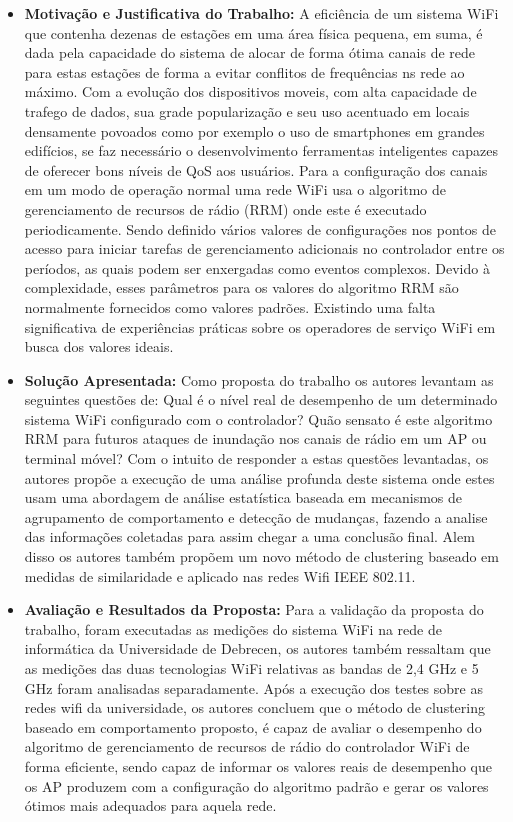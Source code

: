 \documentclass[tid,table]{texufpel} %
\begin{document}
\begin{itemize}
	\item \textbf{Motivação e Justificativa do Trabalho:} A eficiência de um sistema WiFi que contenha dezenas de estações em uma área física pequena, em suma, é dada pela capacidade do sistema de alocar de forma ótima canais de rede para estas estações de forma a evitar conflitos de frequências ns rede ao máximo. Com a evolução dos dispositivos moveis, com alta capacidade de trafego de dados, sua grade popularização e seu uso acentuado em locais densamente povoados como por exemplo o uso de smartphones em grandes edifícios, se faz necessário o desenvolvimento ferramentas inteligentes capazes de oferecer bons níveis de QoS aos usuários. Para a configuração dos canais em um modo de operação normal uma rede WiFi usa o algoritmo de gerenciamento de recursos de rádio (RRM) onde este é executado periodicamente. Sendo definido vários valores de configurações nos pontos de acesso para iniciar tarefas de gerenciamento adicionais no controlador entre os períodos, as quais podem ser enxergadas como eventos complexos. Devido à complexidade, esses parâmetros para os valores do algoritmo RRM são normalmente fornecidos como valores padrões. Existindo uma falta significativa de experiências práticas sobre os operadores de serviço WiFi em busca dos valores ideais.
	
	
	
	\item \textbf{Solução Apresentada:} Como proposta do trabalho os autores levantam as seguintes questões de: Qual é o nível real de desempenho de um determinado sistema WiFi configurado com o controlador? Quão sensato é este algoritmo RRM para futuros ataques de inundação nos canais de rádio em um AP ou terminal móvel? Com o intuito de responder a estas questões levantadas, os autores propõe a execução de uma análise profunda deste sistema onde estes usam uma  abordagem de análise estatística baseada em mecanismos de agrupamento de comportamento e detecção de mudanças, fazendo a analise das informações coletadas para assim chegar a uma conclusão final. Alem disso os autores também propõem um novo método de clustering baseado em medidas de similaridade e aplicado nas redes Wifi IEEE 802.11.
		
	
	\item \textbf{Avaliação e Resultados da Proposta:} Para a validação da proposta do trabalho, foram executadas as medições do sistema WiFi na rede de informática da Universidade de Debrecen, os autores também ressaltam que as medições das duas tecnologias WiFi relativas as bandas de 2,4 GHz e 5 GHz foram analisadas separadamente. Após a execução dos testes sobre as redes wifi da universidade, os autores concluem que o método de clustering baseado em comportamento proposto, é capaz de avaliar o desempenho do algoritmo de gerenciamento de recursos de rádio do controlador WiFi de forma eficiente, sendo capaz de informar os valores reais de desempenho que os AP produzem com a configuração do algoritmo padrão e gerar os valores ótimos mais adequados para aquela rede.
	
	
\end{itemize}
\end{document}
